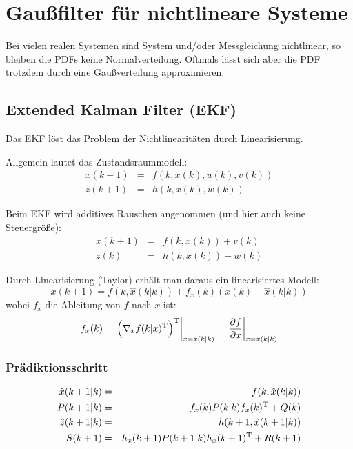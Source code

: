 \chapter{Gaußfilter für nichtlineare Systeme}
Bei vielen realen Systemen sind System und/oder Messgleichung nichtlinear, so bleiben die PDFs keine Normalverteilung. 
Oftmals lässt sich aber die PDF trotzdem durch eine Gaußverteilung approximieren.

\section{Extended Kalman Filter (EKF)}
Das EKF löst das Problem der Nichtlinearitäten durch Linearisierung.

Allgemein lautet das Zustandsraummodell:
\begin{eqnarray*}
    x(k+1) &=& f(k, x(k), u(k), v(k)) \\
    z(k+1) &=& h(k, x(k), w(k))
\end{eqnarray*}

Beim EKF wird additives Rauschen angenommen (und hier auch keine Steuergröße):
\begin{eqnarray*}
    x(k+1) &=& f(k, x(k)) + v(k) \\
    z(k) &=& h(k, x(k)) + w(k)
\end{eqnarray*}

Durch Linearisierung (Taylor) erhält man daraus ein linearisiertes Modell:
\begin{equation*}
    x(k+1) = f(k, \hat{x}(k|k)) + f_x(k) (x(k) - \hat{x}(k|k))
\end{equation*}
wobei $f_x$ die Ableitung von $f$ nach $x$ ist:
\begin{equation*}
    f_x(k) = \left. \left( \nabla_x f(k|x)^\text{T} \right)^\text{T} \right|_{x=\hat{x}(k|k)}
        = \left. \frac{\partial f}{\partial x} \right|_{x=\hat{x}(k|k)}
\end{equation*}

\subsection{Prädiktionsschritt}
\begin{eqnarray*}
    \hat{x}(k+1|k) &=& f(k, \hat{x}(k|k)) \\
    P(k+1|k) &=& f_x(k) P(k|k) f_x(k)^\text{T} + Q(k) \\
    \hat{z}(k+1|k) &=& h(k+1, \hat{x}(k+1|k)) \\
    S(k+1) &=& h_x(k+1) P(k+1|k) h_x(k+1)^\text{T} + R(k+1)
\end{eqnarray*}

